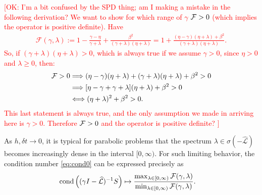 \documentclass[a4paper,10pt]{article}
\newcommand{\tcr}{\textcolor{red}}
\begin{document}
\tcr{[OK: 
I'm a bit confused by the SPD thing; am I making a mistake in the following derivation? We want to show for which range of $\gamma$ ${\cal F} > 0$ (which implies the operator is positive definite). Have 
\begin{align*}
\mathcal{F}(\gamma,\lambda) := 
	1 - \frac{\gamma-\eta}{\gamma + \lambda} + \frac{\beta^2}{(\gamma + \lambda)(\eta+\lambda)} 
	=
1 + \frac{(\eta - \gamma) (\eta + \lambda) + \beta^2}{(\gamma + \lambda) (\eta + \lambda)}. 
\end{align*}
So, if $(\gamma + \lambda) (\eta + \lambda) > 0$, which is always true if we assume $\gamma > 0$, since $\eta > 0$ and $\lambda \geq 0$, then:
\begin{align*}
{\cal F} > 0 
&\Longrightarrow 
(\eta - \gamma) (\eta + \lambda) + (\gamma + \lambda) (\eta + \lambda) + \beta^2  > 0 \\
&\Longrightarrow 
[\eta - \gamma + \gamma + \lambda] (\eta + \lambda) + \beta^2  > 0 \\
& \Longleftrightarrow (\eta + \lambda)^2 + \beta^2 > 0.
\end{align*}
This last statement is always true, and the only assumption we made in arriving here is $\gamma > 0$. Therefore ${\cal F} > 0$ and the operator is positive definite?
]}

%
As $h,\delta t\to 0$, it is typical for parabolic problems that
the spectrum $\lambda\in\sigma\left(-\widehat{\mathcal{L}}\right)$
becomes increasingly dense in the interval $[0,\infty)$. For such limiting
behavior, the condition number \eqref{eq:cond0} can be expressed
precisely as
%
\begin{align}\label{eq:cond1}
\textnormal{cond}\left((\gamma I- \widehat{\mathcal{L}})^{-1}S\right) & \mapsto
	\frac{\max_{\lambda\in[0,\infty)} \mathcal{F}(\gamma,\lambda)}
		{\min_{\lambda\in[0,\infty)} \mathcal{F}(\gamma,\lambda)}.
\end{align}
%
\end{document}
